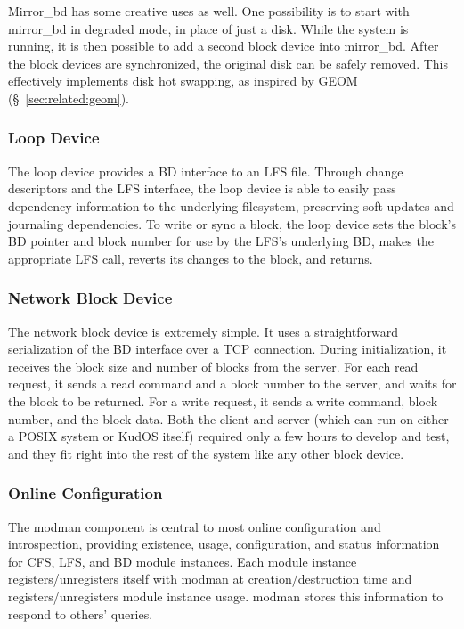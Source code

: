 Mirror\_bd has some creative uses as well. One possibility is to start with
mirror\_bd in degraded mode, in place of just a disk. While the system is
running, it is then possible to add a second block device into mirror\_bd.
After the block devices are synchronized, the original disk can be safely
removed. This effectively implements disk hot swapping, as inspired by GEOM
(\S~\ref{sec:related:geom}).

\subsubsection{Loop Device}
\label{sec:solution:impl:loop}

The loop device provides a BD interface to an LFS file. Through change
descriptors and the LFS interface, the loop device is able to easily pass
dependency information to the underlying filesystem, preserving soft updates and
journaling dependencies. To write or sync a block, the loop device sets the
block's BD pointer and block number for use by the LFS's underlying BD, makes
the appropriate LFS call, reverts its changes to the block, and returns.

\subsubsection{Network Block Device}
\label{sec:solution:impl:nbd}

The network block device is extremely simple. It uses a straightforward
serialization of the BD interface over a TCP connection. During initialization,
it receives the block size and number of blocks from the server. For each read
request, it sends a read command and a block number to the server, and waits for
the block to be returned. For a write request, it sends a write command, block
number, and the block data. Both the client and server (which can run on either
a POSIX system or KudOS itself) required only a few hours to develop and test,
and they fit right into the rest of the system like any other block device.

\subsubsection{Online Configuration}
\label{sec:solution:impl:online}

The modman component is central to most online configuration and introspection,
providing existence, usage, configuration, and status information for CFS, LFS,
and BD module instances. Each module instance registers/unregisters itself with
modman at creation/destruction time and registers/unregisters module instance
usage. modman stores this information to respond to others' queries.

